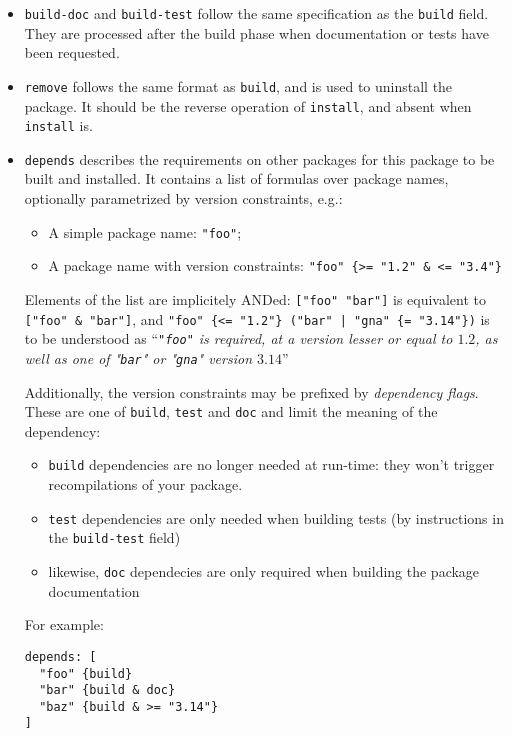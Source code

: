 \documentclass[a4paper,10pt]{article}
\begin{document}
\begin{itemize}
  This field contains typically just {\tt [make "install"]}. It is recommended
  to prefer the usage of a \verb+$NAME.install+ file and omit the {\tt install}
  field.

\item {\tt build-doc} and {\tt build-test} follow the same specification as the
  {\tt build} field. They are processed after the build phase when documentation
  or tests have been requested.

\item {\tt remove} follows the same format as {\tt build}, and is used to
  uninstall the package. It should be the reverse operation of {\tt install},
  and absent when {\tt install} is.

\item {\tt depends} describes the requirements on other packages for this
  package to be built and installed. It contains a list of formulas over package
  names, optionally parametrized by version constraints, e.g.:

  \begin{itemize}
  \item A simple package name: {\tt "foo"};
  \item A package name with version constraints:
    \verb+"foo" {>= "1.2" & <= "3.4"}+
  \end{itemize}

  Elements of the list are implicitely ANDed: \verb+["foo" "bar"]+ is equivalent
  to \verb+["foo" & "bar"]+, and
  \verb+"foo" {<= "1.2"} ("bar" | "gna" {= "3.14"})+ is to be understood as
  ``{\em {\tt "foo"} is required, at a version lesser or equal to $1.2$, as well
    as one of "{\tt bar}" or "{\tt gna}" version $3.14$}''

  Additionally, the version constraints may be prefixed by {\em dependency
    flags}. These are one of \verb+build+, \verb+test+ and \verb+doc+ and limit
  the meaning of the dependency:
  \begin{itemize}
  \item \verb+build+ dependencies are no longer needed at run-time: they won't
    trigger recompilations of your package.
  \item \verb+test+ dependencies are only needed when building tests
    (by instructions in the \verb+build-test+ field)
  \item likewise, \verb+doc+ dependecies are only required when building the
    package documentation
  \end{itemize}
  For example:
\begin{verbatim}
depends: [
  "foo" {build}
  "bar" {build & doc}
  "baz" {build & >= "3.14"}
]
\end{verbatim}


\end{itemize}
\end{document}
